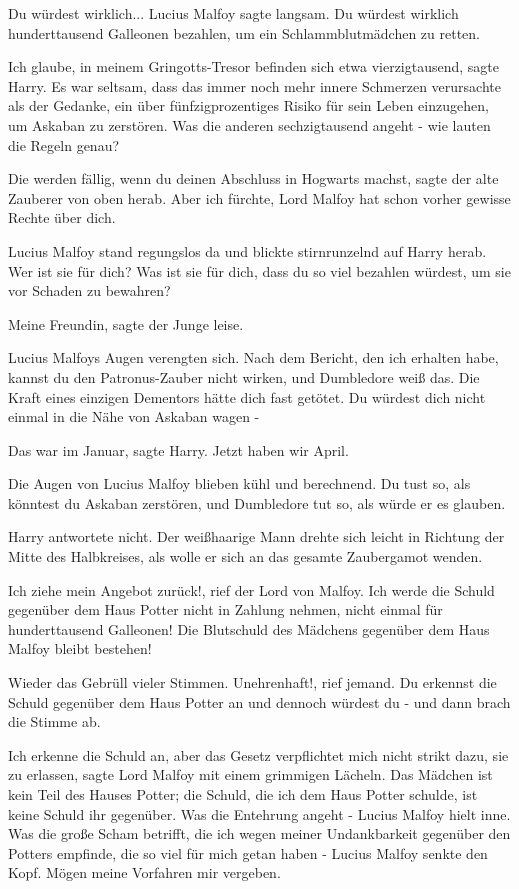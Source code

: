\glqq{}Du würdest wirklich...\grqq{} Lucius Malfoy sagte langsam. \glqq{}Du
würdest wirklich hunderttausend Galleonen bezahlen, um ein Schlammblutmädchen zu
retten.\grqq{}

\glqq{}Ich glaube, in meinem Gringotts-Tresor befinden sich etwa
vierzigtausend\grqq{}, sagte Harry. Es war seltsam, dass das immer noch mehr
innere Schmerzen verursachte als der Gedanke, ein über fünfzigprozentiges Risiko
für sein Leben einzugehen, um Askaban zu zerstören. \glqq{}Was die anderen
sechzigtausend angeht - wie lauten die Regeln genau?\grqq{}

\glqq{}Die werden fällig, wenn du deinen Abschluss in Hogwarts machst\grqq{},
sagte der alte Zauberer von oben herab. \glqq{}Aber ich fürchte, Lord Malfoy hat
schon vorher gewisse Rechte über dich.\grqq{}

Lucius Malfoy stand regungslos da und blickte stirnrunzelnd auf Harry herab.
\glqq{}Wer ist sie für dich? Was ist sie für dich, dass du so viel bezahlen
würdest, um sie vor Schaden zu bewahren?\grqq{}

\glqq{}Meine Freundin\grqq{}, sagte der Junge leise.

Lucius Malfoys Augen verengten sich. \glqq{}Nach dem Bericht, den ich erhalten
habe, kannst du den Patronus-Zauber nicht wirken, und Dumbledore weiß das. Die
Kraft eines einzigen Dementors hätte dich fast getötet. Du würdest dich nicht
einmal in die Nähe von Askaban wagen -\grqq{}

\glqq{}Das war im Januar\grqq{}, sagte Harry. \glqq{}Jetzt haben wir April.\grqq{}

Die Augen von Lucius Malfoy blieben kühl und berechnend. \glqq{}Du tust so, als
könntest du Askaban zerstören, und Dumbledore tut so, als würde er es
glauben.\grqq{}

Harry antwortete nicht. Der weißhaarige Mann drehte sich leicht in Richtung der
Mitte des Halbkreises, als wolle er sich an das gesamte Zaubergamot wenden.

\glqq{}Ich ziehe mein Angebot zurück!\grqq{}, rief der Lord von Malfoy. \glqq{}Ich
werde die Schuld gegenüber dem Haus Potter nicht in Zahlung nehmen, nicht einmal
für hunderttausend Galleonen! Die Blutschuld des Mädchens gegenüber dem Haus
Malfoy bleibt bestehen!\grqq{}

Wieder das Gebrüll vieler Stimmen. \glqq{}Unehrenhaft!\grqq{}, rief jemand. \glqq
Du erkennst die Schuld gegenüber dem Haus Potter an und dennoch würdest du
-\grqq{} und dann brach die Stimme ab.

\glqq{}Ich erkenne die Schuld an, aber das Gesetz verpflichtet mich nicht strikt
dazu, sie zu erlassen\grqq{}, sagte Lord Malfoy mit einem grimmigen Lächeln.
\glqq{}Das Mädchen ist kein Teil des Hauses Potter; die Schuld, die ich dem Haus
Potter schulde, ist keine Schuld ihr gegenüber. Was die Entehrung angeht
-\grqq{} Lucius Malfoy hielt inne. \glqq{}Was die große Scham betrifft, die ich
wegen meiner Undankbarkeit gegenüber den Potters empfinde, die so viel für mich
getan haben -\grqq{} Lucius Malfoy senkte den Kopf. \glqq{}Mögen meine Vorfahren
mir vergeben.\grqq{}

